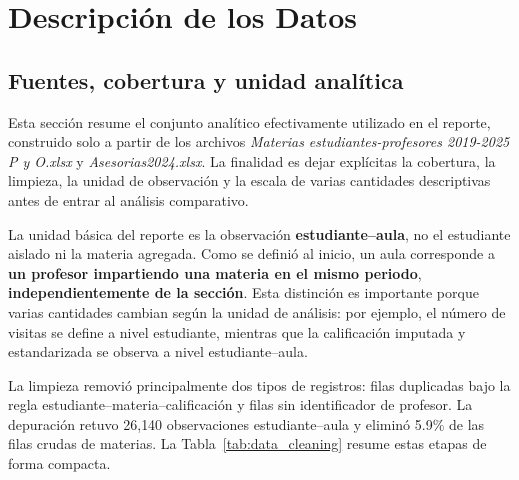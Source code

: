 \documentclass[10pt,letterpaper]{article} %
\numberwithin{figure}{subsection}
\let\oldsection\section
\renewcommand{\section}{\clearpage\oldsection}
\begin{document}
\FloatBarrier
\section{Descripción de los Datos}

\subsection{Fuentes, cobertura y unidad analítica}
Esta sección resume el conjunto analítico efectivamente utilizado en el reporte, construido solo a partir de los archivos \emph{Materias estudiantes-profesores 2019-2025 P y O.xlsx} y \emph{Asesorias2024.xlsx}. La finalidad es dejar explícitas la cobertura, la limpieza, la unidad de observación y la escala de varias cantidades descriptivas antes de entrar al análisis comparativo.



La unidad básica del reporte es la observación \textbf{estudiante--aula}, no el estudiante aislado ni la materia agregada. Como se definió al inicio, un aula corresponde a \textbf{un profesor impartiendo una materia en el mismo periodo}, \textbf{independientemente de la sección}. Esta distinción es importante porque varias cantidades cambian según la unidad de análisis: por ejemplo, el número de visitas se define a nivel estudiante, mientras que la calificación imputada y estandarizada se observa a nivel estudiante--aula.

\begin{table}[!htbp]
    \centering
    \caption{Conteos básicos del conjunto analítico utilizado en el reporte.}
    \label{tab:data_core_counts}
    
\end{table}

La limpieza removió principalmente dos tipos de registros: filas duplicadas bajo la regla estudiante--materia--calificación y filas sin identificador de profesor. La depuración retuvo 26{,}140 observaciones estudiante--aula y eliminó 5.9\% de las filas crudas de materias. La Tabla~\ref{tab:data_cleaning} resume estas etapas de forma compacta.

\begin{table}[!htbp]
    \centering
    \caption{Resumen de los pasos de limpieza recuperables a partir del proceso actual.}
    \label{tab:data_cleaning}
    \begingroup
    \setlength{\tabcolsep}{1pt}
    
    \endgroup
\end{table}
\end{document}

